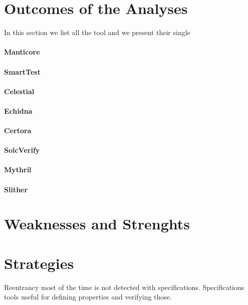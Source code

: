 \section{Outcomes of the Analyses}
In this section we list all the tool and we present their single 

\paragraph{Manticore} 
\paragraph{SmartTest}
\paragraph{Celestial}
\paragraph{Echidna}
\paragraph{Certora}
\paragraph{SolcVerify}
\paragraph{Mythril}
\paragraph{Slither}

\section{Weaknesses and Strenghts}


\section{Strategies}
Reentrancy most of the time is not detected with specifications. 
Specifications tools useful for defining properties and verifying those.

\section{}

